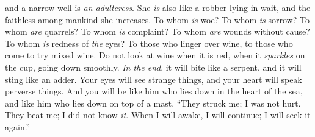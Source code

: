 \begin{biblechapter}
and a narrow well is \textit{an adulteress}.
\verse She \textit{is} also like a robber lying in wait, 
and the faithless among mankind she increases.
\verse To whom \textit{is} woe? To whom \textit{is} sorrow? To whom \textit{are} quarrels? To whom \textit{is} complaint? 
To whom \textit{are} wounds without cause? To whom \textit{is} redness of \textit{the} eyes?
\verse To those who linger over wine, 
to those who come to try mixed wine.
\verse Do not look at wine when it is red, 
when it \textit{sparkles} on the cup, 
going down smoothly.
\verse \textit{In the end}, it will bite like a serpent, 
and it will sting like an adder.
\verse Your eyes will see strange things, 
and your heart will speak perverse things.
\verse And you will be like him who lies down in the heart of the sea, 
and like him who lies down on top of a mast.
\verse “They struck me; I was not hurt. They beat me; I did not know \textit{it}. 
When I will awake, I will continue; I will seek it again.”
\end{biblechapter}

